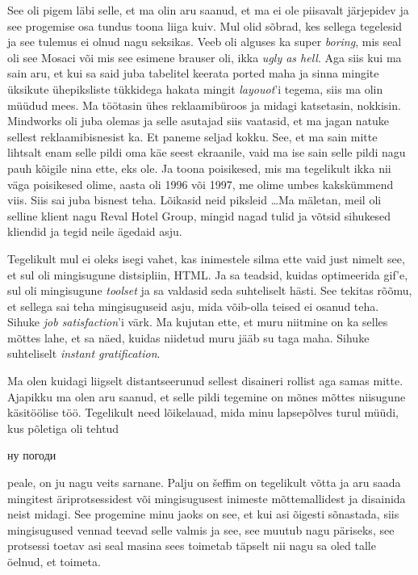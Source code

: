  
See oli pigem läbi selle, et ma olin aru saanud, et ma ei ole piisavalt järjepidev ja see progemise osa  tundus toona liiga kuiv. Mul olid sõbrad, kes sellega tegelesid ja see tulemus ei olnud nagu seksikas. Veeb oli alguses ka super \emph{boring}, mis seal oli see Mosaci või mis see esimene brauser oli, ikka \emph{ugly as hell}. Aga siis kui ma sain aru, et kui sa said juba tabelitel keerata ported maha ja sinna mingite üksikute ühepiksliste tükkidega  hakata mingit \emph{layouot}'i tegema, siis ma olin müüdud mees. Ma töötasin ühes reklaamibüroos ja midagi  katsetasin, nokkisin. Mindworks oli juba olemas ja selle asutajad siis vaatasid, et ma jagan natuke sellest reklaamibisnesist ka.  Et paneme seljad kokku. See, et ma sain mitte lihtsalt enam selle pildi oma käe seest ekraanile, vaid ma ise sain selle pildi nagu pauh kõigile nina ette, eks ole. Ja toona poisikesed, mis ma tegelikult ikka nii väga poisikesed olime, aasta oli 1996 või 1997, me olime umbes kakskümmend viis. Siis sai juba bisnest teha. Lõikasid neid piksleid \ldots Ma mäletan, meil oli selline klient nagu Reval Hotel Group, mingid nagad tulid ja võtsid sihukesed kliendid ja tegid neile ägedaid asju.


Tegelikult mul ei oleks isegi vahet, kas inimestele silma ette vaid just nimelt see, et sul oli mingisugune distsipliin, HTML. Ja sa teadsid, kuidas optimeerida gif'e, sul oli mingisugune \emph{toolset} ja sa valdasid seda suhteliselt hästi. See tekitas rõõmu, et sellega sai teha mingisuguseid asju, mida võib-olla teised ei osanud teha. Sihuke \emph{job satisfaction}'i värk. Ma kujutan ette, et muru niitmine on ka selles mõttes lahe, et sa näed, kuidas niidetud muru jääb su taga maha. Sihuke suhteliselt \emph{instant gratification}.


Ma olen kuidagi liigselt distantseerunud sellest disaineri rollist aga samas mitte. Ajapikku ma olen aru saanud, et selle pildi tegemine on mõnes mõttes niisugune käsitöölise töö. Tegelikult need lõikelauad, mida minu lapsepõlves turul müüdi, kus  põletiga oli tehtud \begin{russian}ну погоди\end{russian} peale, on ju nagu veits sarnane. Palju on šeffim on tegelikult võtta ja aru saada mingitest äriprotsessidest või mingisugusest inimeste mõttemallidest ja disainida neist midagi. See progemine minu jaoks on see, et kui asi õigesti sõnastada, siis mingisugused vennad teevad selle valmis ja see, see muutub nagu päriseks, see  protsessi toetav  asi seal masina sees toimetab täpselt nii nagu sa oled talle  öelnud, et toimeta. 


